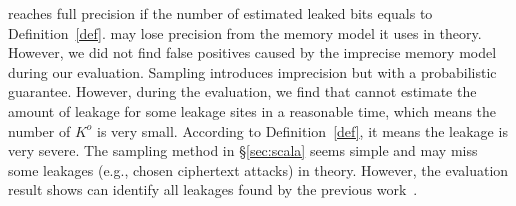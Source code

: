 \tool{} reaches full precision if the number of estimated leaked bits
equals to Definition~\ref{def}.
\tool{} may lose precision from the
memory model it uses in theory. However, we did not find false positives
caused by the imprecise memory model during our evaluation.
Sampling introduces imprecision but with a probabilistic guarantee.
However, during the evaluation, we find that \tool{} cannot estimate
the amount of leakage for some leakage sites in a reasonable time,
which means the number of $K^o$ is very small. According to Definition~\ref{def},
it means the leakage is very severe. The sampling method in \S\ref{sec:scala} seems
simple and may miss some leakages (e.g., chosen ciphertext attacks) in theory.
However, the evaluation result
shows \tool{} can identify all leakages found by the previous work~\cite{203878,236338,Brotzman19Casym}.